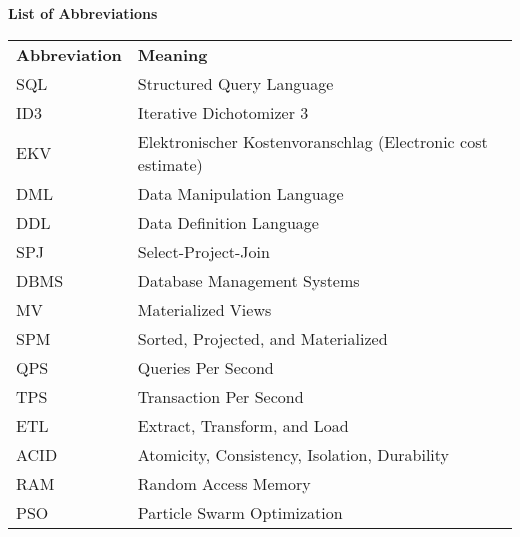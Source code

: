 
% 
\thispagestyle{empty}
\begin{center}
    \huge\textbf{List of Abbreviations}
\end{center}  \vspace{.4cm}

\noindent %

\begin{minipage}{\textwidth}
\begin{tabular}{ll}
    \textbf{Abbreviation} & \textbf{Meaning}\\
    SQL & Structured Query Language\\
    ID3 & Iterative  Dichotomizer 3\\
    EKV & Elektronischer Kostenvoranschlag (Electronic cost estimate)\\
    DML & Data Manipulation Language \\
    DDL & Data Definition Language \\
    SPJ & Select-Project-Join \\
    DBMS & Database Management Systems \\
    MV & {Materialized Views} \\
    SPM & Sorted, Projected, and Materialized \\
    QPS & Queries Per Second \\
    TPS & Transaction Per Second \\
    ETL & Extract, Transform, and Load \\
    ACID & Atomicity, Consistency, Isolation, Durability \\
    RAM & Random Access Memory \\
    PSO & Particle Swarm Optimization \\

\end{tabular}
\end{minipage}

% 

    